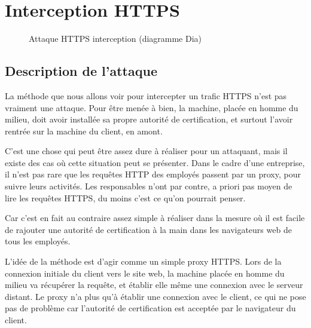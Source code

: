 \chapter{Interception HTTPS}

\label{sec:https-interception}

\begin{figure}[H]
  \caption{Attaque HTTPS interception (diagramme Dia)}
\end{figure}

\section{Description de l'attaque}

La méthode que nous allons voir pour intercepter un trafic HTTPS n'est pas vraiment une attaque. Pour être menée à bien, la machine, placée en homme du milieu, doit avoir installée sa propre autorité de certification, et surtout l'avoir rentrée sur la machine du client, en amont.

C'est une chose qui peut être assez dure à réaliser pour un attaquant, mais il existe des cas où cette situation peut se présenter. Dans le cadre d'une entreprise, il n'est pas rare que les requêtes HTTP des employés passent par un proxy, pour suivre leurs activités. Les responsables n'ont par contre, a priori pas moyen de lire les requêtes HTTPS, du moins c'est ce qu'on pourrait penser.

Car c'est en fait au contraire assez simple à réaliser dans la mesure où il est facile de rajouter une autorité de certification à la main dans les navigateurs web de tous les employés.

L'idée de la méthode est d'agir comme un simple proxy HTTPS. Lors de la connexion initiale du client vers le site web, la machine placée en homme du milieu va récupérer la requête, et établir elle même une connexion avec le serveur distant. Le proxy n'a plus qu'à établir une connexion avec le client, ce qui ne pose pas de problème car l'autorité de certification est acceptée par le navigateur du client.

